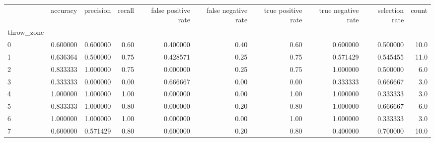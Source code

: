 \begin{tabular}{lrrrrrrrrr}
\toprule
{} &  accuracy &  precision &  recall &  false positive rate &  false negative rate &  true positive rate &  true negative rate &  selection rate &  count \\
throw\_zone &           &            &         &                      &                      &                     &                     &                 &        \\
\midrule
0          &  0.600000 &   0.600000 &    0.60 &             0.400000 &                 0.40 &                0.60 &            0.600000 &        0.500000 &   10.0 \\
1          &  0.636364 &   0.500000 &    0.75 &             0.428571 &                 0.25 &                0.75 &            0.571429 &        0.545455 &   11.0 \\
2          &  0.833333 &   1.000000 &    0.75 &             0.000000 &                 0.25 &                0.75 &            1.000000 &        0.500000 &    6.0 \\
3          &  0.333333 &   0.000000 &    0.00 &             0.666667 &                 0.00 &                0.00 &            0.333333 &        0.666667 &    3.0 \\
4          &  1.000000 &   1.000000 &    1.00 &             0.000000 &                 0.00 &                1.00 &            1.000000 &        0.333333 &    3.0 \\
5          &  0.833333 &   1.000000 &    0.80 &             0.000000 &                 0.20 &                0.80 &            1.000000 &        0.666667 &    6.0 \\
6          &  1.000000 &   1.000000 &    1.00 &             0.000000 &                 0.00 &                1.00 &            1.000000 &        0.333333 &    3.0 \\
7          &  0.600000 &   0.571429 &    0.80 &             0.600000 &                 0.20 &                0.80 &            0.400000 &        0.700000 &   10.0 \\
\bottomrule
\end{tabular}
